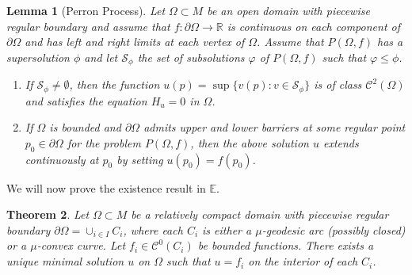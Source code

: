 \documentclass[a4paper,10pt,reqno]{amsart}
\newcommand{\R}{\mathbb{R}}
\newtheorem{theorem}{Theorem}[section]
\newtheorem{lemma}[theorem]{Lemma}
\theoremstyle{definition}
\theoremstyle{remark}
\numberwithin{equation}{section}
\begin{document}
\begin{lemma}[Perron Process]\label{lemma:perron}
Let $\Omega\subset M$ be an open domain with piecewise regular boundary and assume that $f:\partial\Omega\to\R$ is continuous on each component of $\partial\Omega$ and has left and right limits at each vertex of $\Omega$. Assume that $P(\Omega,f)$ has a supersolution $\phi$ and let $\mathcal{S}_{\phi}$ the set of subsolutions $\varphi$ of $P(\Omega,f)$ such that $\varphi\leq\phi$.
\begin{enumerate}[label=\emph{(\arabic*)}]
	\item  If ${\mathcal S}_\phi\neq\emptyset$, then the function $u(p)=\sup\{v(p):v\in {\mathcal S}_\phi\}$ is of class $\mathcal C^2(\Omega)$ and satisfies the equation $H_u=0$ in $\Omega$.
	\item If $\Omega$ is bounded and $\partial\Omega$ admits upper and lower barriers at some regular point $p_0\in\partial\Omega$ for the problem $P(\Omega,f)$, then the above solution $u$ extends continuously at $p_0$ by setting $u(p_0)=f(p_0)$.
\end{enumerate}
\end{lemma}

We will now prove the existence result in $\mathbb{E}$.

\begin{theorem}\label{thm:generalized-existence}
Let $\Omega\subset M$ be a relatively compact domain with piecewise regular boundary $\partial\Omega=\cup_{i\in I}C_i$, where each $C_i$ is either a $\mu$-geodesic arc (possibly closed) or a $\mu$-convex curve. Let $f_i\in\mathcal{C}^0(C_i)$ be bounded functions. There exists a unique minimal solution $u$ on $\Omega$ such that $u=f_i$ on the interior of each $C_i$.
\end{theorem}	
\end{document}
